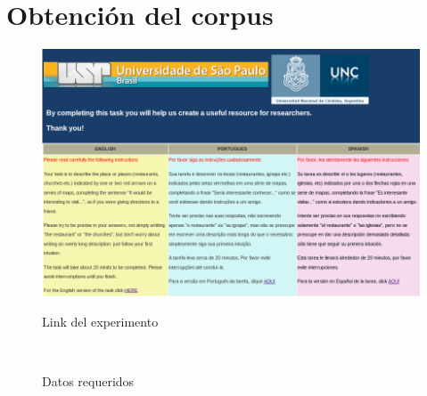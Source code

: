 \appendix
\chapter{Obtenci\'on del corpus}
\label{corpus-apendice}

\begin{figure}[ht]
\begin{center}
\includegraphics[width=13cm]{images/pagPrincipal.png}\\[0pt]
\caption{Link del experimento}
\label{fig-pagPrincipal}
\end{center}
\end{figure}

\begin{figure}[ht]
\begin{center}
\\[0pt]
\caption{Datos requeridos}
\label{fig-nacionalidadGenero}
\end{center}
\end{figure}

